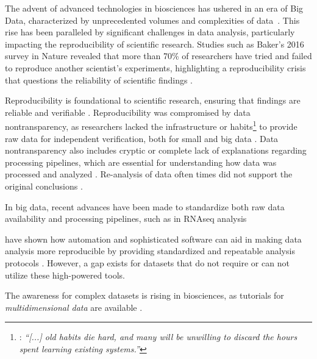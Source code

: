 

%
\label{sec:code_automation}%
The advent of advanced technologies in biosciences has ushered in an era of Big
Data, characterized by unprecedented volumes and complexities of
data~\cite{yangScalabilityValidationBig2017,
    ekmekciIntroductionProgrammingBioscientists2016}. This rise has been paralleled
by significant challenges in data analysis, particularly impacting the
reproducibility of scientific research. Studies such as Baker's 2016 survey in
Nature revealed that more than 70\% of researchers have tried and failed to
reproduce another scientist's experiments, highlighting a reproducibility crisis
that questions the reliability of scientific findings \cite{baker500ScientistsLift2016,begleyReproducibilityScienceImproving2015,ioannidisWhyMostPublished2005}.

Reproducibility is foundational to scientific research, ensuring that findings
are reliable and verifiable \cite{goodmanWhatDoesResearch2016}. Reproducibility
was compromised by data nontransparency, as researchers lacked the infrastructure or habits\footnote{ %
    \citet{pengReproducibleResearchComputational2011}: \textit{ ``[...] old
        habits die hard, and many will be unwilling to discard the hours spent
        learning existing systems.'' }
} %
to provide raw data for independent verification, both for small and big data
\cite{pengReproducibleResearchComputational2011,
mesirovAccessibleReproducibleResearch2010}.
 Data nontransparency also includes
cryptic or complete lack of explanations regarding processing pipelines, which
are essential for understanding how data was processed and analyzed \cite{gosselinInsufficientTransparencyStatistical2021}. Re-analysis
of data often times did not support the original conclusions
\cite{witwerDataSubmissionQuality2013}. 


In big data, recent advances have been made to standardize both raw data availability and
processing pipelines, such as in RNAseq analysis

have shown how automation
and sophisticated software can aid in making data analysis more reproducible by
providing standardized and repeatable analysis protocols
\cite{meiCanBigData2018}. However, a gap exists for datasets that do not require
or can not utilize these high-powered tools.

The awareness for complex datasets is rising in biosciences, as tutorials for
\textit{multidimensional data} are available
\cite{krzywinskiMultidimensionalData2013,dunnExploringVisualizingMultidimensional2017}.

